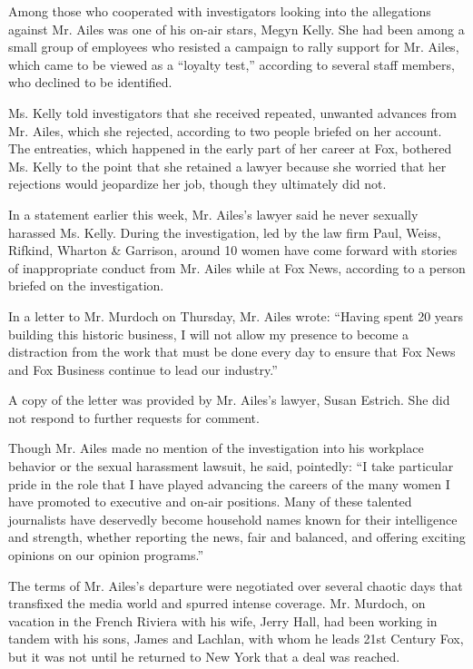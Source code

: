 Among those who cooperated with investigators looking into the
allegations against Mr. Ailes was one of his on-air stars, Megyn Kelly.
She had been among a small group of employees who resisted a campaign to
rally support for Mr. Ailes, which came to be viewed as a ``loyalty
test,'' according to several staff members, who declined to be
identified.

Ms. Kelly told investigators that she received repeated, unwanted
advances from Mr. Ailes, which she rejected, according to two people
briefed on her account. The entreaties, which happened in the early part
of her career at Fox, bothered Ms. Kelly to the point that she retained
a lawyer because she worried that her rejections would jeopardize her
job, though they ultimately did not.

In a statement earlier this week, Mr. Ailes's lawyer said he never
sexually harassed Ms. Kelly. During the investigation, led by the law
firm Paul, Weiss, Rifkind, Wharton \& Garrison, around 10 women have
come forward with stories of inappropriate conduct from Mr. Ailes while
at Fox News, according to a person briefed on the investigation.

In a letter to Mr. Murdoch on Thursday, Mr. Ailes wrote: ``Having spent
20 years building this historic business, I will not allow my presence
to become a distraction from the work that must be done every day to
ensure that Fox News and Fox Business continue to lead our industry.''

A copy of the letter was provided by Mr. Ailes's lawyer, Susan Estrich.
She did not respond to further requests for comment.

Though Mr. Ailes made no mention of the investigation into his workplace
behavior or the sexual harassment lawsuit, he said, pointedly: ``I take
particular pride in the role that I have played advancing the careers of
the many women I have promoted to executive and on-air positions. Many
of these talented journalists have deservedly become household names
known for their intelligence and strength, whether reporting the news,
fair and balanced, and offering exciting opinions on our opinion
programs.''

The terms of Mr. Ailes's departure were negotiated over several chaotic
days that transfixed the media world and spurred intense coverage. Mr.
Murdoch, on vacation in the French Riviera with his wife, Jerry Hall,
had been working in tandem with his sons, James and Lachlan, with whom
he leads 21st Century Fox, but it was not until he returned to New York
that a deal was reached.


